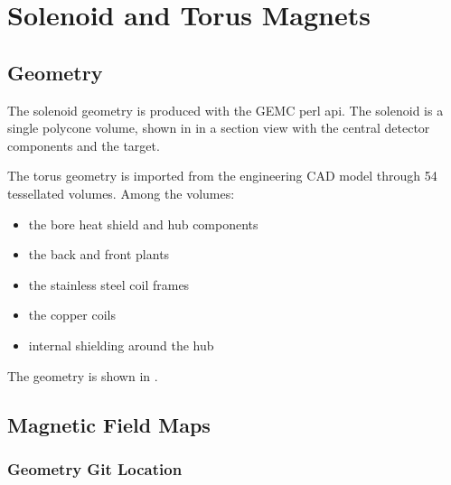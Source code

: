 \section{Solenoid and Torus Magnets}


\subsection{Geometry}
The solenoid geometry is produced with the GEMC perl api. The solenoid is a single polycone volume, shown in 
in a section view with the central detector components and the target.

The torus geometry is imported from the engineering CAD model through 54 tessellated volumes. Among the volumes:

\begin{itemize}
	\item the bore heat shield and hub components
	\item the back and front plants
	\item the stainless steel coil frames
	\item the copper coils
	\item internal shielding around the hub
\end{itemize}

The geometry is shown in . 

\subsection{Magnetic Field Maps}



\subsubsection{Geometry Git Location}

